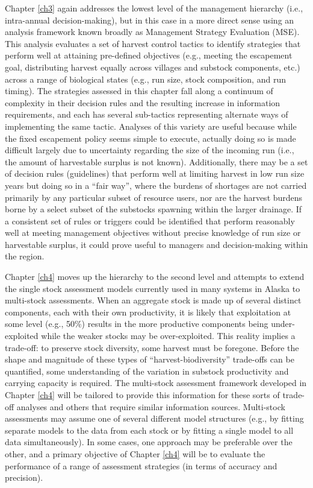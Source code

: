 \documentclass[12pt,]{book}
\theoremstyle{definition}
\theoremstyle{definition}
\theoremstyle{definition}
\theoremstyle{remark}
\begin{document}
Chapter \ref{ch3} again addresses the lowest level of the management
hierarchy (i.e., intra-annual decision-making), but in this case in a
more direct sense using an analysis framework known broadly as
Management Strategy Evaluation (MSE). This analysis evaluates a set of
harvest control tactics to identify strategies that perform well at
attaining pre-defined objectives (e.g., meeting the escapement goal,
distributing harvest equally across villages and substock components,
etc.) across a range of biological states (e.g., run size, stock
composition, and run timing). The strategies assessed in this chapter
fall along a continuum of complexity in their decision rules and the
resulting increase in information requirements, and each has several
sub-tactics representing alternate ways of implementing the same tactic.
Analyses of this variety are useful because while the fixed escapement
policy seems simple to execute, actually doing so is made difficult
largely due to uncertainty regarding the size of the incoming run (i.e.,
the amount of harvestable surplus is not known). Additionally, there may
be a set of decision rules (guidelines) that perform well at limiting
harvest in low run size years but doing so in a ``fair way'', where the
burdens of shortages are not carried primarily by any particular subset
of resource users, nor are the harvest burdens borne by a select subset
of the substocks spawning within the larger drainage. If a consistent
set of rules or triggers could be identified that perform reasonably
well at meeting management objectives without precise knowledge of run
size or harvestable surplus, it could prove useful to managers and
decision-making within the region.

Chapter \ref{ch4} moves up the hierarchy to the second level and
attempts to extend the single stock assessment models currently used in
many systems in Alaska to multi-stock assessments. When an aggregate
stock is made up of several distinct components, each with their own
productivity, it is likely that exploitation at some level (e.g., 50\%)
results in the more productive components being under-exploited while
the weaker stocks may be over-exploited. This reality implies a
trade-off: to preserve stock diversity, some harvest must be foregone.
Before the shape and magnitude of these types of
``harvest-biodiversity'' trade-offs can be quantified, some
understanding of the variation in substock productivity and carrying
capacity is required. The multi-stock assessment framework developed in
Chapter \ref{ch4} will be tailored to provide this information for these
sorts of trade-off analyses and others that require similar information
sources. Multi-stock assessments may assume one of several different
model structures (e.g., by fitting separate models to the data from each
stock or by fitting a single model to all data simultaneously). In some
cases, one approach may be preferable over the other, and a primary
objective of Chapter \ref{ch4} will be to evaluate the performance of a
range of assessment strategies (in terms of accuracy and precision).
\end{document}
